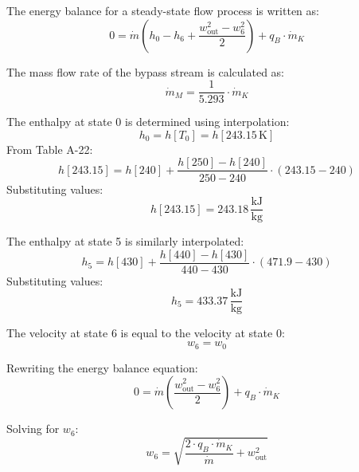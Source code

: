 The energy balance for a steady-state flow process is written as:  
\[
0 = \dot{m} \left( h_0 - h_6 + \frac{w_{\text{out}}^2 - w_6^2}{2} \right) + q_B \cdot \dot{m}_K
\]  

The mass flow rate of the bypass stream is calculated as:  
\[
\dot{m}_M = \frac{1}{5.293} \cdot \dot{m}_K
\]  

The enthalpy at state 0 is determined using interpolation:  
\[
h_0 = h[T_0] = h[243.15 \, \text{K}]
\]  
From Table A-22:  
\[
h[243.15] = h[240] + \frac{h[250] - h[240]}{250 - 240} \cdot (243.15 - 240)
\]  
Substituting values:  
\[
h[243.15] = 243.18 \, \frac{\text{kJ}}{\text{kg}}
\]  

The enthalpy at state 5 is similarly interpolated:  
\[
h_5 = h[430] + \frac{h[440] - h[430]}{440 - 430} \cdot (471.9 - 430)
\]  
Substituting values:  
\[
h_5 = 433.37 \, \frac{\text{kJ}}{\text{kg}}
\]  

The velocity at state 6 is equal to the velocity at state 0:  
\[
w_6 = w_0
\]  

Rewriting the energy balance equation:  
\[
0 = \dot{m} \left( \frac{w_{\text{out}}^2 - w_6^2}{2} \right) + q_B \cdot \dot{m}_K
\]  

Solving for \( w_6 \):  
\[
w_6 = \sqrt{\frac{2 \cdot q_B \cdot \dot{m}_K}{\dot{m}} + w_{\text{out}}^2}
\]
